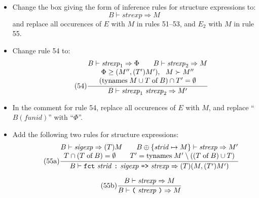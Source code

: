 \documentclass[twoside,titlepage]{article}
\begin{document}
\begin{appendix}
\begin{itemize}
\item Change the box giving the form of inference rules for structure expressions to:
  $$
  \boxed{B \vdash \mathit{strexp} \Rightarrow M}
  $$
  and replace all occurences of $E$ with $M$ in rules 51--53, and $E_2$ with $M$ in rule 55.

\item Change rule 54 to:
  \begin{equation}
  \tag{54}
  \frac{
  \begin{array}{@{}c@{}}
  B \vdash \mathit{strexp}_1 \Rightarrow \Phi
  \qquad
  B \vdash \mathit{strexp}_2 \Rightarrow M
  \\
  \Phi \geq (M'',(T')M'),~~ M \succ M''
  \\
  (\mbox{tynames}\;M \cup T\;\mbox{of}\;B) \cap T' = \emptyset
  \end{array}
  }{
  B \vdash \mathit{strexp}_1~\mathit{strexp}_2 \Rightarrow M'
  }
  \end{equation}

\item In the comment for rule 54, replace all occurences of $E$ with $M$, and replace ``$B(\mathit{funid})$'' with ``$\Phi$''.

\item Add the following two rules for structure expressions:
  \begin{equation}
  \tag{55a}
  \frac{
  \begin{array}{@{}c@{}}
  B \vdash \mathit{sigexp} \Rightarrow (T)M
  \qquad
  B \oplus \{\mathit{strid}\mapsto M\} \vdash \mathit{strexp} \Rightarrow M'
  \\
  T \cap (T\;\mbox{of}\;B) = \emptyset
  \qquad
  T' = \mbox{tynames}\;M' \setminus ((T\;\mbox{of}\;B) \cup T)
  \end{array}
  }{
  B \vdash {\tt{fct}}~\mathit{strid}~\mbox{\tt:}~\mathit{sigexp}~\mbox{\tt=>}~\mathit{strexp} \Rightarrow (T)(M,(T')M')
  }
  \end{equation}

  \begin{equation}
  \tag{55b}
  \frac{
  B \vdash \mathit{strexp} \Rightarrow M
  }{
  B \vdash \mbox{\tt(}~\mathit{strexp}~\mbox{\tt)} \Rightarrow M
  }
  \end{equation}


\end{itemize}
\end{appendix}
\end{document}
